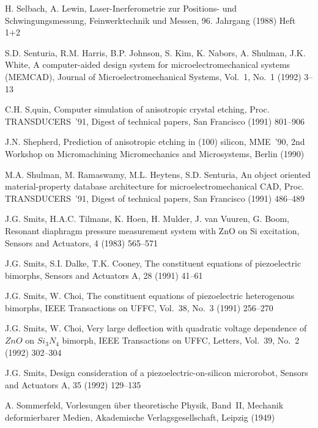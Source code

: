 \begin{thebibliography}{xxx}
 H. Selbach, A. Lewin, Laser-Inerferometrie zur Positions- und
 Schwingungsmessung, Feinwerktechnik und Messen, 96. Jahrgang (1988) Heft 1+2

 S.D. Senturia, R.M. Harris, B.P. Johnson, S. Kim, K. Nabors, A. Shulman,
 J.K. White, A computer-aided design system for microelectromechanical
 systems ({\sf MEMCAD}), Journal of Microelectromechanical Systems, Vol.~1,
 No.~1 (1992) 3--13

 C.H. S‚quin, Computer simulation of anisotropic crystal etching, Proc.
 TRANSDUCERS~'91, Digest of technical papers, San Francisco (1991) 801--906

 J.N. Shepherd, Prediction of anisotropic etching in (100) silicon,
 MME~'90, 2nd Workshop on Micromachining Micromechanics and Microsystems,
 Berlin (1990)

 M.A. Shulman, M. Ramaswamy, M.L. Heytens, S.D. Senturia, An object oriented
 material-property database architecture for microelectromechanical CAD,
 Proc. TRANSDUCERS~'91, Digest of technical papers, San Francisco
 (1991) 486--489

 J.G. Smits, H.A.C. Tilmans, K. Hoen, H. Mulder, J. van Vuuren, G. Boom,
 Resonant diaphragm pressure measurement system with ZnO on Si excitation,
 Sensors and Actuators, 4 (1983) 565--571

 J.G. Smits, S.I. Dalke, T.K. Cooney, The constituent equations of
 piezoelectric bimorphs, Sensors and Actuators A, 28 (1991) 41--61

 J.G. Smits, W. Choi, The constituent equations of piezoelectric
 heterogenous bimorphs, IEEE Transactions on UFFC, Vol.~38, No.~3 (1991)
 256--270

 J.G. Smits, W. Choi, Very large deflection with quadratic voltage dependence
 of $ZnO$ on $Si_{3}N_{4}$ bimorph, IEEE Transactions on UFFC, Letters,
 Vol.~39, No.~2 (1992) 302--304

 J.G. Smits, Design consideration of a piezoelectric-on-silicon microrobot,
 Sensors and Actuators A, 35 (1992) 129--135

 A. Sommerfeld, Vorlesungen über theoretische Physik, Band~II, Mechanik
 deformierbarer Medien, Akademische Verlagsgesellschaft, Leipzig (1949)


\end{thebibliography}
